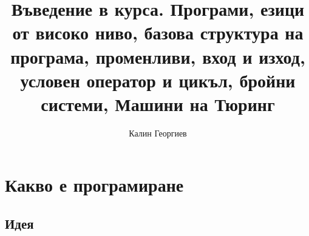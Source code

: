 \documentclass{beamer}
\begin{document}
\title[Увод в курса]{Въведение в курса. Програми, езици от високо ниво, базова структура на програма, променливи, вход и изход, условен оператор и цикъл, бройни системи, Машини на Тюринг} 
\author{Калин Георгиев} 
\frame{\titlepage} 

\section{Какво е програмиране} 
\subsection{Идея}



\end{document}
